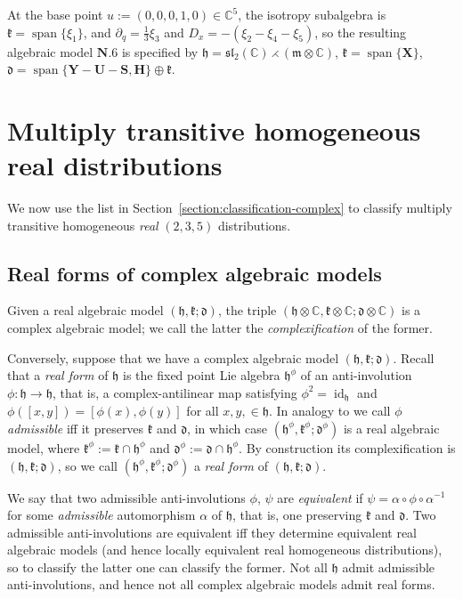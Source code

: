 \documentclass[pdftex]{sigma}
\DeclareMathOperator{\id} {id}
\DeclareMathOperator{\spanOperator}{span}
\newcommand{\Span}[1]{\spanOperator\{{#1}\}}
\newcommand{\bbC}{\mathbb{C}}
\newcommand{\mbH}{\mathbf{H}}
\newcommand{\mbS}{\mathbf{S}}
\newcommand{\mbU}{\mathbf{U}}
\newcommand{\mbX}{\mathbf{X}}
\newcommand{\mbY}{\mathbf{Y}}
\newcommand{\mfd} {\mathfrak{d}}
\newcommand{\mfh} {\mathfrak{h}}
\newcommand{\mfk} {\mathfrak{k}}
\newcommand{\mfm} {\mathfrak{m}}
\newcommand{\mfsl} {\mathfrak{sl}}
\numberwithin{equation}{section}
\begin{document}
\begin{Example}
At the base point $u := (0, 0, 0, 1, 0) \in \bbC^5$, the isotropy subalgebra is $\mfk = \Span{\xi_1}$, and $\partial_q = \frac{1}{3} \xi_3$ and $D_x = -(\xi_2 - \xi_4 - \xi_5)$, so the resulting algebraic model $\mathbf{N.6}$ is specified by $\mfh = \mfsl_2(\bbC) \rightthreetimes (\mfm \otimes \bbC)$, $\mfk = \Span{\mbX}$, $\mfd = \Span{\mbY - \mbU - \mbS, \mbH} \oplus \mfk$.
\end{Example}

\section{Multiply transitive homogeneous real distributions}\label{section:classification-real}

We now use the list in Section~\ref{section:classification-complex} to classify multiply transitive homogeneous \textit{real} $(2, 3, 5)$ distributions.

\subsection{Real forms of complex algebraic models}

Given a real algebraic model $(\mfh, \mfk; \mfd)$, the triple $(\mfh \otimes \bbC, \mfk \otimes \bbC; \mfd \otimes \bbC)$ is a complex algebraic model; we call the latter the \textit{complexification} of the former.

Conversely, suppose that we have a complex algebraic model $(\mfh, \mfk; \mfd)$. Recall that a \textit{real form} of $\mfh$ is the fixed point Lie algebra $\mfh^{\phi}$ of an anti-involution $\phi \colon \mfh \to \mfh$, that is, a complex-antilinear map satisfying $\phi^2 = \id_{\mfh}$ and $\phi([x, y]) = [\phi(x), \phi(y)]$ for all $x, y, \in \mfh$. In analogy to \cite[Section~3]{DMT} we call $\phi$ \textit{admissible} iff it preserves $\mfk$ and $\mfd$, in which case $(\mfh^{\phi}, \mfk^{\phi}; \mfd^{\phi})$ is a real algebraic model, where $\mfk^{\phi} := \mfk \cap \mfh^{\phi}$ and $\mfd^{\phi} := \mfd \cap \mfh^{\phi}$. By construction its complexification is $(\mfh, \mfk; \mfd)$, so we call $(\mfh^{\phi}, \mfk^{\phi}; \mfd^{\phi})$ a \textit{real form} of $(\mfh, \mfk; \mfd)$.

We say that two admissible anti-involutions $\phi$, $\psi$ are \textit{equivalent} if $\psi = \alpha \circ \phi \circ \alpha^{-1}$ for some \textit{admissible} automorphism $\alpha$ of $\mfh$, that is, one preserving $\mfk$ and $\mfd$. Two admissible anti-involutions are equivalent iff they determine equivalent real algebraic models (and hence locally equivalent real homogeneous distributions), so to classify the latter one can classify the former. Not all $\mfh$ admit admissible anti-involutions, and hence not all complex algebraic models admit real forms.
\end{document}
